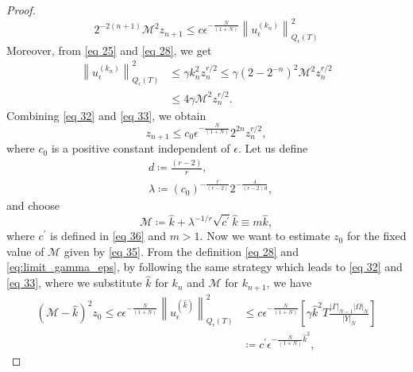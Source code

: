 \begin{proof}
\begin{equation}
    2^{-2(n+1)} \mathcal{M}^{2} z_{n+1} \leq c \epsilon^{-\frac{N}{(1+N)}}\left\|u_{\epsilon}^{\left(k_{n}\right)}\right\|_{Q_{\epsilon}(T)}^{2}
\label{eq 32}
\end{equation}
Moreover, from \eqref{eq 25} and \eqref{eq 28}, we get
\begin{equation}
    \begin{aligned}
        \left\|u_{\epsilon}^{\left(k_{n}\right)}\right\|_{Q_{\epsilon}(T)}^{2} & \leq \gamma k_{n}^{2} z_{n}^{r / 2} \leq \gamma\left(2-2^{-n}\right)^{2} \mathcal{M}^{2} z_{n}^{r / 2} \\
        & \leq 4 \gamma \mathcal{M}^{2} z_{n}^{r / 2}.
    \end{aligned}
\label{eq 33}\end{equation}
Combining \eqref{eq 32} and \eqref{eq 33}, we obtain
\begin{equation}
    z_{n+1} \leq c_{0} \epsilon^{-\frac{N}{(1+N)}} 2^{2 n} z_{n}^{r / 2},
\label{eq 34}
\end{equation}
where $c_{0}$ is a positive constant independent of $\epsilon$.
Let us define
$$
    \begin{aligned}
        &d\coloneqq \frac{(r-2)}{r}, \\
        &\lambda\coloneqq \left(c_{0}\right)^{-\frac{r}{(r-2)}} 2^{-\frac{4}{(r-2) d}},
    \end{aligned}
$$
and choose
\begin{equation}
  \mathcal{M}\coloneqq \hat{k}+\lambda^{-1 / r} \sqrt{c^{\prime}} \hat{k} \equiv m \hat{k},
\label{eq 35}\end{equation}
where $c^{\prime}$ is defined in \eqref{eq 36} and $m>1$. Now we want to estimate $z_{0}$ for the fixed value of $\mathcal{M}$ given by \eqref{eq 35}. From the definition \eqref{eq 28} and \eqref{eq:limit_gamma_eps}, by following the same strategy which leads to \eqref{eq 32} and \eqref{eq 33}, where we substitute $\hat{k}$ for $k_{n}$ and $\mathcal{M}$ for $k_{n+1}$, we have
\begin{equation}
    \begin{aligned}
        (\mathcal{M}-\hat{k})^{2} z_{0} \leq c \epsilon^{-\frac{N}{(1+N)}}\left\|u_{\epsilon}^{(\hat{k})}\right\|_{Q_{\epsilon}(T)}^{2} & \leq c \epsilon^{-\frac{N}{(1+N)}}\left[\gamma \hat{k}^{2} T \frac{|\Gamma|_{N-1}|\Omega|_{N}}{|Y|_{N}}\right] \\
        &\coloneqq c^{\prime} \epsilon^{-\frac{N}{(1+N)} \hat{k}^{2}},
    \end{aligned}

\end{equation}
\end{proof}

